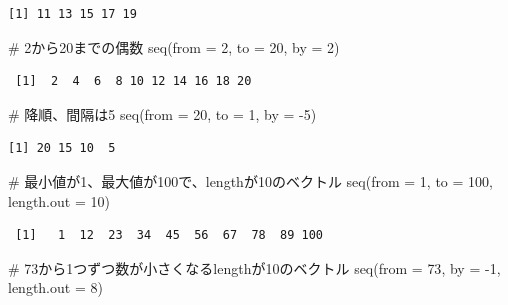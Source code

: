 \documentclass[
  a4paper,
  pandoc,
  ja=standard,
  jafont=haranoaji]{bxjsbook}
\newenvironment{Shaded}{\begin{snugshade}}{\end{snugshade}}
\newcommand{\AttributeTok}[1]{\textcolor[rgb]{0.00,0.48,0.65}{#1}}
\newcommand{\CommentTok}[1]{\textcolor[rgb]{0.37,0.37,0.37}{#1}}
\newcommand{\DecValTok}[1]{\textcolor[rgb]{0.68,0.00,0.00}{#1}}
\newcommand{\FunctionTok}[1]{\textcolor[rgb]{0.28,0.35,0.67}{#1}}
\newcommand{\NormalTok}[1]{\textcolor[rgb]{0.00,0.48,0.65}{#1}}
\newcommand{\SpecialCharTok}[1]{\textcolor[rgb]{0.37,0.37,0.37}{#1}}
\begin{document}
\begin{verbatim}
[1] 11 13 15 17 19
\end{verbatim}

\begin{Shaded}
\begin{Highlighting}[numbers=left,,]
\CommentTok{\# 2から20までの偶数}
\FunctionTok{seq}\NormalTok{(}\AttributeTok{from =}  \DecValTok{2}\NormalTok{, }\AttributeTok{to =}  \DecValTok{20}\NormalTok{, }\AttributeTok{by =} \DecValTok{2}\NormalTok{)}
\end{Highlighting}
\end{Shaded}

\begin{verbatim}
 [1]  2  4  6  8 10 12 14 16 18 20
\end{verbatim}

\begin{Shaded}
\begin{Highlighting}[numbers=left,,]
\CommentTok{\# 降順、間隔は5}
\FunctionTok{seq}\NormalTok{(}\AttributeTok{from =} \DecValTok{20}\NormalTok{, }\AttributeTok{to =}   \DecValTok{1}\NormalTok{, }\AttributeTok{by =} \SpecialCharTok{{-}}\DecValTok{5}\NormalTok{)}
\end{Highlighting}
\end{Shaded}

\begin{verbatim}
[1] 20 15 10  5
\end{verbatim}

\begin{Shaded}
\begin{Highlighting}[numbers=left,,]
\CommentTok{\# 最小値が1、最大値が100で、lengthが10のベクトル}
\FunctionTok{seq}\NormalTok{(}\AttributeTok{from =}  \DecValTok{1}\NormalTok{, }\AttributeTok{to =} \DecValTok{100}\NormalTok{, }\AttributeTok{length.out =} \DecValTok{10}\NormalTok{)}
\end{Highlighting}
\end{Shaded}

\begin{verbatim}
 [1]   1  12  23  34  45  56  67  78  89 100
\end{verbatim}

\begin{Shaded}
\begin{Highlighting}[numbers=left,,]
\CommentTok{\# 73から1つずつ数が小さくなるlengthが10のベクトル}
\FunctionTok{seq}\NormalTok{(}\AttributeTok{from =} \DecValTok{73}\NormalTok{, }\AttributeTok{by =} \SpecialCharTok{{-}}\DecValTok{1}\NormalTok{, }\AttributeTok{length.out =} \DecValTok{8}\NormalTok{)}
\end{Highlighting}
\end{Shaded}
\end{document}
